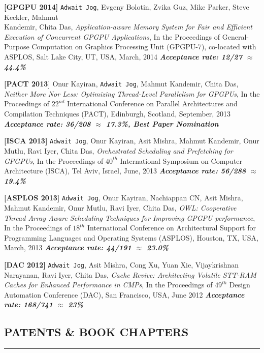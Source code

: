 \documentclass[10pt,a4]{article}
\begin{document}
\begin{description}
\item{\bf [GPGPU 2014]}
{\tt Adwait Jog}, Evgeny Bolotin, Zvika Guz, Mike Parker, Steve Keckler, Mahmut \\ Kandemir, Chita Das, 
{\it Application-aware Memory System for Fair and Efficient Execution of Concurrent GPGPU Applications}, 
In the Proceedings of General-Purpose Computation on Graphics Processing Unit (GPGPU-7), co-located with ASPLOS, Salt Lake City, UT, USA, March, 2014
\textbf{\textit{Acceptance rate: 12/27 $\approx$ 44.4\%}}

\item{\bf [PACT 2013]}
Onur Kayiran, {\tt Adwait Jog}, Mahmut Kandemir, Chita Das,
{\it Neither More Nor Less: Optimizing Thread-Level Parallelism for GPGPUs},
In the Proceedings of $22^{nd}$ International Conference on Parallel Architectures and Compilation Techniques (PACT), 
Edinburgh, Scotland, September, 2013 
\textbf{\textit{Acceptance rate: 36/208 $\approx$ 17.3\%, Best Paper Nomination}}

\item{\bf [ISCA 2013]}
{\tt Adwait Jog}, Onur Kayiran, Asit Mishra, Mahmut Kandemir, Onur Mutlu, Ravi Iyer, Chita Das, 
{\it Orchestrated Scheduling and Prefetching for GPGPUs}, 
In the Proceedings of $40^{th}$ International Symposium on Computer Architecture (ISCA), Tel Aviv, Israel, June, 2013
\textbf{\textit{Acceptance rate: 56/288 $\approx$ 19.4\%}}

\item{\bf [ASPLOS 2013]} 
{\tt Adwait Jog}, Onur Kayiran, Nachiappan CN, Asit Mishra, Mahmut Kandemir, Onur Mutlu, Ravi Iyer, Chita Das, 
{\it OWL: Cooperative Thread Array Aware Scheduling Techniques for Improving GPGPU performance},
In the Proceedings of $18^{th}$ International Conference on Architectural Support for Programming Languages and Operating Systems (ASPLOS), Houston, TX, USA, March, 2013 
\textbf{\textit{Acceptance rate: 44/191 $\approx$ 23.0\%}}

\item{\bf [DAC 2012]}
{\tt Adwait Jog}, Asit Mishra, Cong Xu, Yuan Xie, Vijaykrishnan Narayanan, 
Ravi Iyer, Chita Das, {\it Cache Revive: Architecting Volatile STT-RAM Caches for Enhanced 
Performance in CMPs}, 
In the Proceedings of $49^{th}$ Design Automation Conference (DAC), San Francisco, USA, June 2012
\textbf{\textit{Acceptance rate: 168/741 $\approx$ 23\%}}

\end{description}

\subsection*{PATENTS \& BOOK CHAPTERS}
\hrule
\vspace{0.2cm}
\end{document}
